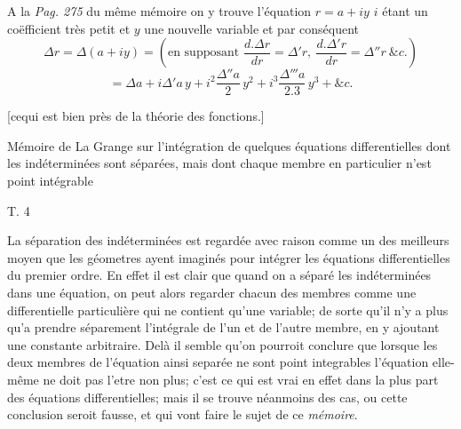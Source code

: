 \documentclass[11pt,a4paper]{article}
\begin{document}
A la \emph{Pag. 275} du même mémoire on y trouve l'équation $r = a + iy$
$i$ étant un coëfficient très petit et $y$ une nouvelle variable et par conséquent
\[ \Delta r = \Delta(a + iy) = \left(\text{en supposant } \frac{d.\Delta r}{dr} = \Delta' r,\ \frac{d.\Delta' r}{dr} = \Delta'' r\ \&c.\right) \]
\[ = \Delta a + i\Delta' a\,y + i^{2}\frac{\Delta'' a}{2}\,y^{2} + i^{3}\frac{\Delta''' a}{2.3}\,y^{3} + \&c. \]

[cequi est bien près de la théorie des fonctions.]



Mémoire de La Grange sur l'intégration de quelques équations
differentielles dont les indéterminées sont séparées, mais dont
chaque membre en particulier n'est point intégrable

T. 4

La séparation des indéterminées est regardée avec raison comme un des
meilleurs moyen que les géometres ayent imaginés pour intégrer les
équations differentielles du premier ordre. En effet il est clair
que quand on a séparé les indéterminées dans une équation, on
peut alors regarder chacun des membres comme une differentielle
particulière qui ne contient qu'une variable; de sorte qu'il n'y
a plus qu'a prendre séparement l'intégrale de l'un et de
l'autre membre, en y ajoutant une constante arbitraire.
Delà il semble qu'on pourroit conclure que lorsque les deux
membres de l'équation \struck{\ill{}} ainsi separée ne sont point integrables
l'équation elle-même ne doit pas l'etre non plus; c'est ce
qui est vrai en effet dans la plus part des équations
differentielles; mais il se trouve néanmoins des cas, ou cette
conclusion seroit fausse, et qui vont faire le sujet de ce
\emph{mémoire}.
\end{document}
